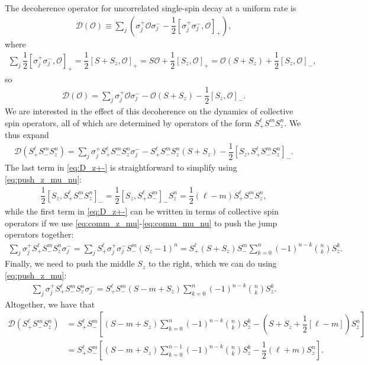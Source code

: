 \documentclass[aps,notitlepage,nofootinbib,11pt]{revtex4-1}
\newcommand{\f}[2]{\dfrac{#1}{#2}} %
\newcommand{\p}[1]{\left(#1\right)} %
\renewcommand{\sp}[1]{\left[#1\right]} %
\newcommand{\D}{\mathcal{D}}
\renewcommand{\O}{\mathcal{O}}
\newcommand{\1}{\mathds{1}}
\begin{document}
The decoherence operator for uncorrelated single-spin decay at a
uniform rate is
\begin{align}
  \D\p{\O}
  \equiv \sum_j\p{\sigma_j^+\O\sigma_j^-
    - \f12\sp{\sigma_j^+\sigma_j^-,\O}_+},
\end{align}
where
\begin{align}
  \sum_j \f12\sp{\sigma_j^+\sigma_j^-,\O}_+
  = \f12\sp{S+S_z,\O}_+
  = S\O + \f12\sp{S_z,\O}_+
  = \O\p{S+S_z} + \f12\sp{S_z,\O}_-,
\end{align}
so
\begin{align}
  \D\p{\O}
  = \sum_j \sigma_j^+\O\sigma_j^- - \O\p{S + S_z} - \f12 \sp{S_z,\O}_-.
\end{align}
We are interested in the effect of this decoherence on the dynamics of
collective spin operators, all of which are determined by operators of
the form $S_+^\ell S_-^m S_z^n$.  We thus expand
\begin{align}
  \D\p{S_+^\ell S_-^m S_z^n}
  = \sum_j \sigma_j^+ S_+^\ell S_-^m S_z^n \sigma_j^-
  - S_+^\ell S_-^m S_z^n \p{S + S_z}
  - \f12 \sp{S_z, S_+^\ell S_-^m S_z^n}_-.
  \label{eq:D_z+-}
\end{align}
The last term in \eqref{eq:D_z+-} is straightforward to simplify using
\eqref{eq:push_z_mu_nu}:
\begin{align}
  \f12 \sp{S_z, S_+^\ell S_-^m S_z^n}_-
  = \f12 \sp{S_z, S_+^\ell S_-^m}_- S_z^n
  = \f12 \p{\ell-m} S_+^\ell S_-^m S_z^n,
\end{align}
while the first term in \eqref{eq:D_z+-} can be written in terms of
collective spin operators if we use
\eqref{eq:comm_z_mu}-\eqref{eq:comm_mu_nu} to push the jump operators
together:
\begin{align}
  \sum_j \sigma_j^+ S_+^\ell S_-^m S_z^n \sigma_j^-
  = \sum_j S_+^\ell \sigma_j^+ \sigma_j^- S_-^m \p{S_z-1}^n
  = S_+^\ell \p{S + S_z} S_-^m
  \sum_{k=0}^n \p{-1}^{n-k} { n \choose k } S_z^k.
\end{align}
Finally, we need to push the middle $S_z$ to the right, which we can
do using \eqref{eq:push_z_mu}:
\begin{align}
  \sum_j \sigma_j^+ S_+^\ell S_-^m S_z^n \sigma_j^-
  = S_+^\ell S_-^m \p{S - m + S_z}
  \sum_{k=0}^n \p{-1}^{n-k} { n \choose k } S_z^k.
\end{align}
Altogether, we have that
\begin{align}
  \D\p{S_+^\ell S_-^m S_z^n}
  &= S_+^\ell S_-^m \sp{\p{S - m + S_z} \sum_{k=0}^n
    \p{-1}^{n-k} { n \choose k } S_z^k
    - \p{S + S_z + \f12\sp{\ell-m}} S_z^n} \\
  &= S_+^\ell S_-^m \sp{\p{S - m + S_z} \sum_{k=0}^{n-1}
    \p{-1}^{n-k} { n \choose k } S_z^k - \f12 \p{\ell+m} S_z^n}.
\end{align}
\end{document}
